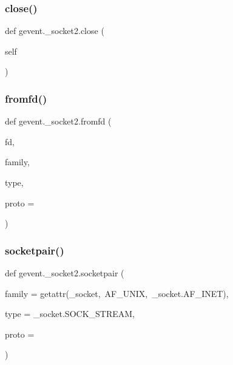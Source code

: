 \mbox{\label{namespacegevent_1_1__socket2_af1f81f0318af39f13007c97ce6f4cb59}} 
\subsubsection{\texorpdfstring{close()}{close()}}
{\footnotesize\ttfamily def gevent.\+\_\+socket2.\+close (\begin{DoxyParamCaption}\item[{}]{self }\end{DoxyParamCaption})}

\mbox{\label{namespacegevent_1_1__socket2_aa53a2bfe42bf85f7ce5226e7a3aaf1e5}} 
\subsubsection{\texorpdfstring{fromfd()}{fromfd()}}
{\footnotesize\ttfamily def gevent.\+\_\+socket2.\+fromfd (\begin{DoxyParamCaption}\item[{}]{fd,  }\item[{}]{family,  }\item[{}]{type,  }\item[{}]{proto = {} }\end{DoxyParamCaption})}

\mbox{\label{namespacegevent_1_1__socket2_a4b018b6c679f6878289b2b1a4375b6bb}} 
\subsubsection{\texorpdfstring{socketpair()}{socketpair()}}
{\footnotesize\ttfamily def gevent.\+\_\+socket2.\+socketpair (\begin{DoxyParamCaption}\item[{}]{family = {\ttfamily getattr(\+\_\+socket,~\textquotesingle{}AF\+\_\+UNIX\textquotesingle{},~\+\_\+socket.AF\+\_\+INET)},  }\item[{}]{type = {\ttfamily \+\_\+socket.SOCK\+\_\+STREAM},  }\item[{}]{proto = {} }\end{DoxyParamCaption})}

